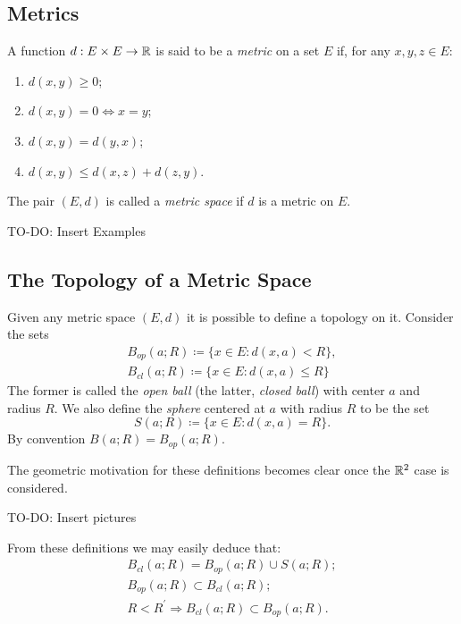 \subsection{Metrics}
\begin{definition}
	A function $d : E \times E \to \mathbb{R}$ is said to be a \emph{metric} on a set $E$ if, for any $x,y,z \in E$:
\begin{enumerate}
	\item
		$d(x,y) \geq 0$;
	\item
		$d(x,y) = 0 \Leftrightarrow x = y$;
	\item
		$d(x,y) = d(y,x)$;
	\item
		$d(x,y) \leq d(x,z) + d(z,y)$.
\end{enumerate}
The pair $(E, d)$ is called a \emph{metric space} if $d$ is a metric on $E$.
\end{definition}

TO-DO: Insert Examples

\subsection{The Topology of a Metric Space}
Given any metric space $(E, d)$ it is possible to define a topology on it. Consider the sets
\begin{align*}
	B_{op}(a;R) \coloneqq \{ x \in E : d(x,a) < R \}, \\
	B_{cl}(a;R) \coloneqq \{ x \in E : d(x,a) \leq  R \}
\end{align*}
The former is called the \emph{open ball} (the latter, \emph{closed ball}) with center $a$ and radius $R$.
We also define the \emph{sphere} centered at $a$ with radius $R$ to be the set
\begin{equation*}
	S(a;R) \coloneqq \{ x \in E : d(x,a) = R \}.
\end{equation*}
By convention $B(a;R) = B_{op}(a;R)$. \par
The geometric motivation for these definitions becomes clear once the $\mathbb{R}^2$ case is considered. 

TO-DO: Insert pictures

From these definitions we may easily deduce that:
\begin{align*}
	B_{cl}(a;R) = B_{op}(a;R) \cup S(a;R) ; \\
	B_{op}(a;R) \subset B_{cl}(a;R) ; \\
	R < R^\prime \Rightarrow B_{cl}(a;R) \subset B_{op}(a;R).
\end{align*}

